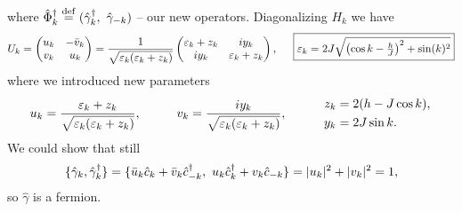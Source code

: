 where $\hat{\Phi}_k\D \overset{\mathrm{def}}{=}   (\hat{\gamma}_k\D,\ \hat{\gamma}_{-k})$ -- our new operators. Diagonalizing $H_k$ we have
\begin{equation}
	U_k = \begin{pmatrix}
	    u_k & -\bar{v}_k \\
	    v_k & u_k \\
	\end{pmatrix} = 
	\frac{1}{\sqrt{\varepsilon_k(\varepsilon_k + z_k)}} \begin{pmatrix}
	    \varepsilon_k + z_k & i y_k \\
	    i y_k & \varepsilon_k + z_k \\
	\end{pmatrix},
	\hspace{5 mm} 
	\boxed{
	\varepsilon_k = 2 J \sqrt{\left(\cos k - \tfrac{h}{J}\right)^2 + \sin(k)^{2}}
	}
	\label{gap}
\end{equation}
where we introduced new parameters
\begin{equation*}
	u_k = \frac{\varepsilon_k + z_k}{\sqrt{\varepsilon_k (\varepsilon_k + z_k)}},
	\hspace{10 mm} 
	v_k = \frac{i y_k}{\sqrt{\varepsilon_k (\varepsilon_k + z_k)}},
	\hspace{10 mm} 
	\left.\begin{aligned}
    	z_k &= 2(h-J\cos k), \\
		y_k &= 2 J \sin k.
	\end{aligned}\right.
\end{equation*}
We could show that still
\begin{equation*}
	\{\hat{\gamma}_k, \hat{\gamma}_k^{\dag}\} = \{\bar{u}_k \hat{c}_k + \bar{v}_k \hat{c}^{\dag}_{-k},\ u_k \hat{c}_k^{\dag} + v_k \hat{c}_{-k}\} = |u_k|^2 + |v_k|^2 = 1,
\end{equation*}
so $\hat{\gamma}$ is a fermion. 

